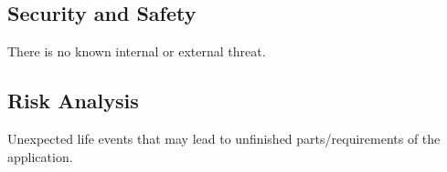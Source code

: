 \documentclass{article}
\begin{document}

%
%
\subsection{Security and Safety}
There is no known internal or external threat.


\subsection{Risk Analysis}
Unexpected life events that may lead to unfinished parts/requirements of the application. 
\end{document}
